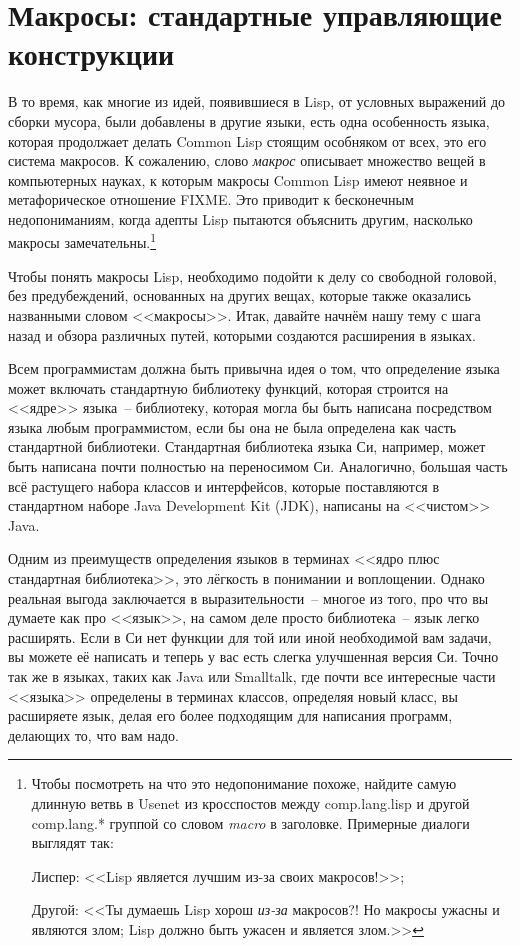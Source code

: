 \chapter{Макросы: стандартные управляющие конструкции}
\label{ch:07}

В то время, как многие из идей, появившиеся в Lisp, от условных выражений до сборки
мусора, были добавлены в другие языки, есть одна особенность языка, которая продолжает
делать Common Lisp стоящим особняком от всех, это его система макросов. К сожалению, слово
\textit{макрос} описывает множество вещей в компьютерных науках, к которым макросы Common Lisp
имеют неявное и метафорическое отношение FIXME. Это приводит к бесконечным недопониманиям,
когда адепты Lisp пытаются объяснить другим, насколько макросы
замечательны.\footnote{Чтобы посмотреть на что это недопонимание похоже, найдите самую
  длинную ветвь в Usenet из кросспостов между comp.lang.lisp и другой comp.lang.* группой
  со словом \textit{macro} в заголовке. Примерные диалоги выглядят так:

Лиспер: <<Lisp является лучшим из-за своих макросов!>>;

Другой: <<Ты думаешь Lisp хорош \textit{из-за} макросов?! Но макросы ужасны и являются злом; Lisp
должно быть ужасен и является злом.>>}

Чтобы понять макросы Lisp, необходимо подойти к делу со свободной головой, без
предубеждений, основанных на других вещах, которые также оказались названными словом
<<макросы>>. Итак, давайте начнём нашу тему с шага назад и обзора различных путей, которыми
создаются расширения в языках.

Всем программистам должна быть привычна идея о том, что определение языка может включать
стандартную библиотеку функций, которая строится на <<ядре>> языка~-- библиотеку, которая
могла бы быть написана посредством языка любым программистом, если бы она не была
определена как часть стандартной библиотеки. Стандартная библиотека языка Си, например,
может быть написана почти полностью на переносимом Си. Аналогично, большая часть всё
растущего набора классов и интерфейсов, которые поставляются в стандартном наборе Java
Development Kit (JDK), написаны на <<чистом>> Java.

Одним из преимуществ определения языков в терминах <<ядро плюс стандартная библиотека>>, это
лёгкость в понимании и воплощении. Однако реальная выгода заключается в выразительности~--
многое из того, про что вы думаете как про <<язык>>, на самом деле просто библиотека~-- язык
легко расширять. Если в Си нет функции для той или иной необходимой вам задачи, вы можете
её написать и теперь у вас есть слегка улучшенная версия Си. Точно так же в языках, таких
как Java или Smalltalk, где почти все интересные части <<языка>> определены в терминах
классов, определяя новый класс, вы расширяете язык, делая его более подходящим для
написания программ, делающих то, что вам надо.

